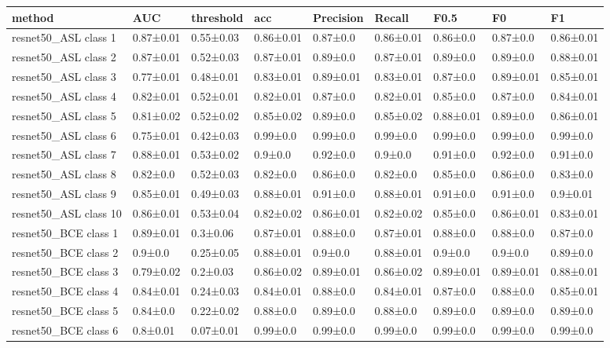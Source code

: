 \begin{tabular}{lllllllll}
\toprule
method & AUC & threshold & acc & Precision & Recall & F0.5 & F0 & F1 \\
\midrule
resnet50_ASL class 1 & 0.87±0.01 & 0.55±0.03 & 0.86±0.01 & 0.87±0.0 & 0.86±0.01 & 0.86±0.0 & 0.87±0.0 & 0.86±0.01 \\
resnet50_ASL class 2 & 0.87±0.01 & 0.52±0.03 & 0.87±0.01 & 0.89±0.0 & 0.87±0.01 & 0.89±0.0 & 0.89±0.0 & 0.88±0.01 \\
resnet50_ASL class 3 & 0.77±0.01 & 0.48±0.01 & 0.83±0.01 & 0.89±0.01 & 0.83±0.01 & 0.87±0.0 & 0.89±0.01 & 0.85±0.01 \\
resnet50_ASL class 4 & 0.82±0.01 & 0.52±0.01 & 0.82±0.01 & 0.87±0.0 & 0.82±0.01 & 0.85±0.0 & 0.87±0.0 & 0.84±0.01 \\
resnet50_ASL class 5 & 0.81±0.02 & 0.52±0.02 & 0.85±0.02 & 0.89±0.0 & 0.85±0.02 & 0.88±0.01 & 0.89±0.0 & 0.86±0.01 \\
resnet50_ASL class 6 & 0.75±0.01 & 0.42±0.03 & 0.99±0.0 & 0.99±0.0 & 0.99±0.0 & 0.99±0.0 & 0.99±0.0 & 0.99±0.0 \\
resnet50_ASL class 7 & 0.88±0.01 & 0.53±0.02 & 0.9±0.0 & 0.92±0.0 & 0.9±0.0 & 0.91±0.0 & 0.92±0.0 & 0.91±0.0 \\
resnet50_ASL class 8 & 0.82±0.0 & 0.52±0.03 & 0.82±0.0 & 0.86±0.0 & 0.82±0.0 & 0.85±0.0 & 0.86±0.0 & 0.83±0.0 \\
resnet50_ASL class 9 & 0.85±0.01 & 0.49±0.03 & 0.88±0.01 & 0.91±0.0 & 0.88±0.01 & 0.91±0.0 & 0.91±0.0 & 0.9±0.01 \\
resnet50_ASL class 10 & 0.86±0.01 & 0.53±0.04 & 0.82±0.02 & 0.86±0.01 & 0.82±0.02 & 0.85±0.0 & 0.86±0.01 & 0.83±0.01 \\
resnet50_BCE class 1 & 0.89±0.01 & 0.3±0.06 & 0.87±0.01 & 0.88±0.0 & 0.87±0.01 & 0.88±0.0 & 0.88±0.0 & 0.87±0.0 \\
resnet50_BCE class 2 & 0.9±0.0 & 0.25±0.05 & 0.88±0.01 & 0.9±0.0 & 0.88±0.01 & 0.9±0.0 & 0.9±0.0 & 0.89±0.0 \\
resnet50_BCE class 3 & 0.79±0.02 & 0.2±0.03 & 0.86±0.02 & 0.89±0.01 & 0.86±0.02 & 0.89±0.01 & 0.89±0.01 & 0.88±0.01 \\
resnet50_BCE class 4 & 0.84±0.01 & 0.24±0.03 & 0.84±0.01 & 0.88±0.0 & 0.84±0.01 & 0.87±0.0 & 0.88±0.0 & 0.85±0.01 \\
resnet50_BCE class 5 & 0.84±0.0 & 0.22±0.02 & 0.88±0.0 & 0.89±0.0 & 0.88±0.0 & 0.89±0.0 & 0.89±0.0 & 0.89±0.0 \\
resnet50_BCE class 6 & 0.8±0.01 & 0.07±0.01 & 0.99±0.0 & 0.99±0.0 & 0.99±0.0 & 0.99±0.0 & 0.99±0.0 & 0.99±0.0 \\

\end{tabular}
